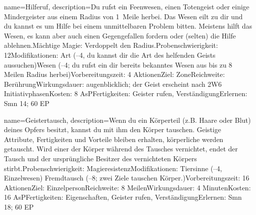 {
    name={Hilferuf},
    description={Du rufst ein Feenwesen, einen Totengeist oder einige Mindergeister aus einem Radius von 1 Meile herbei. Das Wesen eilt zu dir und du kannst es um Hilfe bei einem unmittelbaren Problem bitten. Meistens hilft das Wesen, es kann aber auch einen Gegengefallen fordern oder (selten) die Hilfe ablehnen.\newline Mächtige Magie: Verdoppelt den Radius.\newline Probenschwierigkeit: 12\newline Modifikationen: Art (–4, du kannst dir die Art des helfenden Geists aussuchen)\newline Wesen (–4; du rufst ein dir bereits bekanntes Wesen aus bis zu 8 Meilen Radius herbei)\newline Vorbereitungszeit: 4 Aktionen\newline Ziel: Zone\newline Reichweite: Berührung\newline Wirkungsdauer: augenblicklich; der Geist erscheint nach 2W6 Initiativphasen\newline Kosten: 8 AsP\newline Fertigkeiten: Geister rufen, Verständigung\newline Erlernen: Smn 14; 60 EP}
}


{
    name={Geistertausch},
    description={Wenn du ein Körperteil (z.B. Haare oder Blut) deines Opfers besitzt, kannst du mit ihm den Körper tauschen. Geistige Attribute, Fertigkeiten und Vorteile bleiben erhalten, körperliche werden getauscht. Wird einer der Körper während des Tausches vernichtet, endet der Tausch und der ursprüngliche Besitzer des vernichteten Körpers stirbt.\newline Probenschwierigkeit: Magieresistenz\newline Modifikationen: Tiersinne (–4, Einzelwesen) Fremdtausch (–8; zwei Ziele tauschen Körper.)\newline Vorbereitungszeit: 16 Aktionen\newline Ziel: Einzelperson\newline Reichweite: 8 Meilen\newline Wirkungsdauer: 4 Minuten\newline Kosten: 16 AsP\newline Fertigkeiten: Eigenschaften, Geister rufen, Verständigung\newline Erlernen: Smn 18; 60 EP}
}


